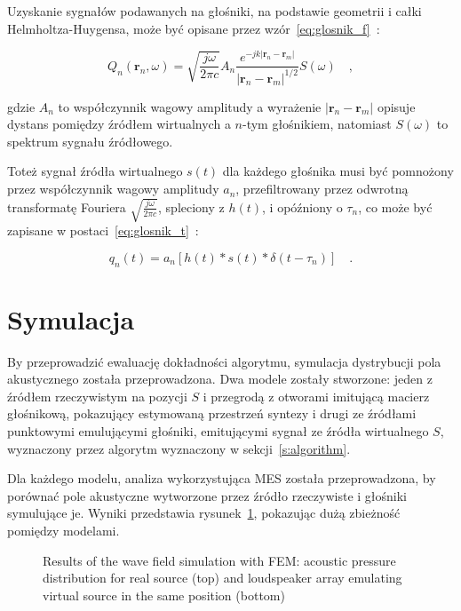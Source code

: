 \documentclass[12pt]{oska}
\let\Oldsection\section
\renewcommand{\section}{\FloatBarrier\Oldsection}
\begin{document}
Uzyskanie sygnałów podawanych na głośniki, na podstawie geometrii i całki
Helmholtza-Huygensa, może być opisane przez
wzór~\eqref{eq:glosnik_f}~\cite{delay}:

\begin{equation}
  Q_n(\bm{r}_n,\omega) = \sqrt{\frac{j\omega}{2\pi c}} A_n \frac {e^{-jk|\bm{r}_n-\bm{r}_m|}}{|\bm{r}_n-\bm{r}_m|^{1/2}} S(\omega) \quad,
  \label{eq:glosnik_f}
\end{equation}

gdzie $A_n$ to współczynnik wagowy amplitudy a wyrażenie
$|\bm{r}_n-\bm{r}_m|$ opisuje dystans pomiędzy źródłem wirtualnych
a $n$-tym głośnikiem, natomiast $S(\omega)$ to spektrum sygnału źródłowego.

Toteż sygnał źródła wirtualnego $s(t)$ dla każdego głośnika musi być pomnożony
przez współczynnik wagowy amplitudy $a_n$, przefiltrowany przez odwrotną
transformatę Fouriera $\sqrt{\frac{j\omega}{2\pi c}}$, spleciony z $h(t)$, i
opóźniony o $\tau_n$, co może być zapisane w postaci~\eqref{eq:glosnik_t}~\cite{enhancement}:

\begin{equation}
  q_n(t) = a_n\left[h(t)*s(t)*\delta(t-\tau_n)\right] \quad. \label{eq:glosnik_t}
\end{equation}

\section{Symulacja}

By przeprowadzić ewaluację dokładności algorytmu, symulacja dystrybucji pola
akustycznego została przeprowadzona. Dwa modele zostały stworzone: jeden z
źródłem rzeczywistym na pozycji $S$ i przegrodą z otworami imitującą macierz
głośnikową, pokazujący estymowaną przestrzeń syntezy i drugi ze źródłami
punktowymi emulującymi głośniki, emitującymi sygnał ze źródła wirtualnego $S$,
wyznaczony przez algorytm wyznaczony w sekcji~\ref{s:algorithm}.

Dla każdego modelu, analiza wykorzystująca MES została przeprowadzona, by
porównać pole akustyczne wytworzone przez źródło rzeczywiste i głośniki
symulujące je. Wyniki przedstawia rysunek~\ref{r:fem}, pokazując dużą zbieżność
pomiędzy modelami.

\begin{figure}[!tbh]
  \centering
  \caption{Results of the wave field simulation with FEM: acoustic
    pressure distribution for real source (top) and loudspeaker array
  emulating virtual source in the same position (bottom)}
  \label{r:fem}
\end{figure}
\end{document}
